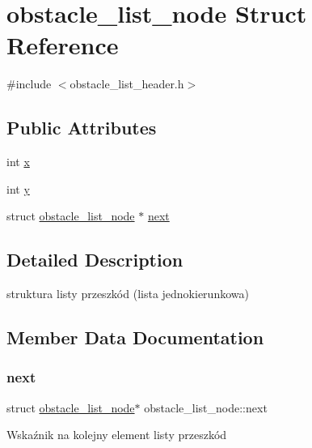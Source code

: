 \hypertarget{structobstacle__list__node}{}\section{obstacle\+\_\+list\+\_\+node Struct Reference}
\label{structobstacle__list__node}


{\ttfamily \#include $<$obstacle\+\_\+list\+\_\+header.\+h$>$}

\subsection*{Public Attributes}
\begin{DoxyCompactItemize}
\item 
int \mbox{\hyperlink{structobstacle__list__node_a6adfff6fda8024ce8161c8f8533e2009}{x}}
\item 
int \mbox{\hyperlink{structobstacle__list__node_adf07a5716da68f286493728cfb0d12fa}{y}}
\item 
struct \mbox{\hyperlink{structobstacle__list__node}{obstacle\+\_\+list\+\_\+node}} $\ast$ \mbox{\hyperlink{structobstacle__list__node_a69526377e0b479b151289a1453f1b6b1}{next}}
\end{DoxyCompactItemize}


\subsection{Detailed Description}
struktura listy przeszkód (lista jednokierunkowa) 

\subsection{Member Data Documentation}
\mbox{\label{structobstacle__list__node_a69526377e0b479b151289a1453f1b6b1}} 
\subsubsection{\texorpdfstring{next}{next}}
{\footnotesize\ttfamily struct \mbox{\hyperlink{structobstacle__list__node}{obstacle\+\_\+list\+\_\+node}}$\ast$ obstacle\+\_\+list\+\_\+node\+::next}

Wskaźnik na kolejny element listy przeszkód \mbox{\label{structobstacle__list__node_a6adfff6fda8024ce8161c8f8533e2009}} 
